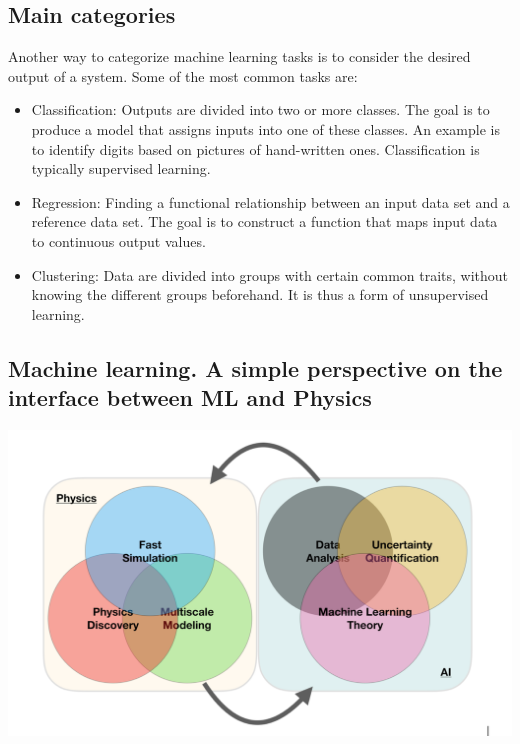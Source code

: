 \documentclass[%
oneside,                 %
final,                   %
10pt]{article}
\begin{document}
\subsection{Main categories}
\begin{block}{}
Another way to categorize machine learning tasks is to consider the desired output of a system.
Some of the most common tasks are:

\begin{itemize}
  \item Classification: Outputs are divided into two or more classes. The goal is to   produce a model that assigns inputs into one of these classes. An example is to identify  digits based on pictures of hand-written ones. Classification is typically supervised learning.

  \item Regression: Finding a functional relationship between an input data set and a reference data set.   The goal is to construct a function that maps input data to continuous output values.

  \item Clustering: Data are divided into groups with certain common traits, without knowing the different groups beforehand.  It is thus a form of unsupervised learning.
\end{itemize}

\noindent
\end{block}

\subsection{Machine learning. A simple perspective on the interface between ML and Physics}

\vspace{6mm}

\centerline{\includegraphics[width=1.0\linewidth]{figures/mlimage.png}}
\end{document}
